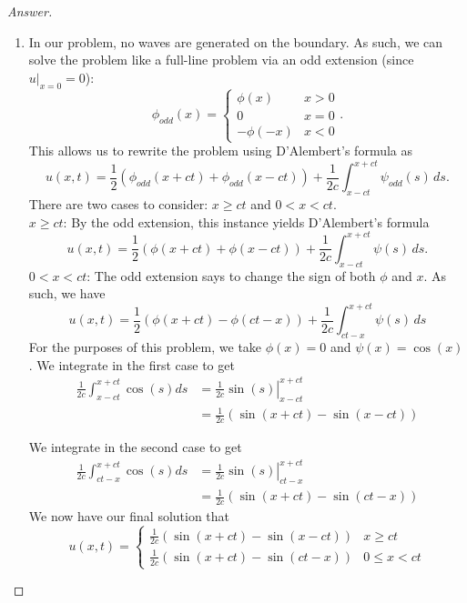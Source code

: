 \documentclass{article}
\theoremstyle{definition}
\renewcommand\qedsymbol{$\blacksquare$}
\newenvironment{ans}{\begin{proof}[Answer]\renewcommand{\qedsymbol}{}}{\end{proof}}
\begin{document}
\begin{ans}
\begin{enumerate}[(1), start=9]
    \item In our problem, no waves are generated on the boundary. As such, we can solve the problem like a full-line problem via an odd extension (since $u|_{x=0} = 0$):
    \[\phi_{odd}(x) = \begin{cases}
        \phi(x) & x > 0\\
        0 & x = 0\\
        -\phi(-x) & x < 0
    \end{cases}.\]
    This allows us to rewrite the problem using D'Alembert's formula as
    \[u(x,t) = \frac{1}{2}(\phi_{odd}(x+ct) + \phi_{odd}(x-ct)) + \frac{1}{2c}\int_{x-ct}^{x+ct}\psi_{odd}(s)\,ds.\]
    There are two cases to consider: $x \geq ct$ and $0 < x < ct$.\\
    \underline{$x \geq ct$}: By the odd extension, this instance yields D'Alembert's formula
    \[u(x,t) = \frac{1}{2}(\phi(x+ct) + \phi(x-ct)) + \frac{1}{2c}\int_{x-ct}^{x+ct}\psi(s)\,ds.\]
    \underline{$0 < x < ct$}: The odd extension says to change the sign of both $\phi$ and $x$. As such, we have
    \[u(x,t) = \frac{1}{2}(\phi(x+ct) - \phi(ct-x)) + \frac{1}{2c}\int_{ct-x}^{x+ct}\psi(s)\,ds\]
    For the purposes of this problem, we take $\phi(x) = 0$ and $\psi(x) = \cos(x)$. We integrate in the first case to get 
    \begin{align*}
        \frac{1}{2c}\int_{x-ct}^{x+ct}\cos(s)ds &= \left.\frac{1}{2c}\sin(s)\right|_{x-ct}^{x+ct}\\
        &=\frac{1}{2c}(\sin(x+ct) - \sin(x-ct))
    \end{align*}

    We integrate in the second case to get
    \begin{align*}
        \frac{1}{2c}\int_{ct-x}^{x+ct}\cos(s)ds &= \left.\frac{1}{2c}\sin(s)\right|_{ct-x}^{x+ct}\\
        &= \frac{1}{2c}(\sin(x+ct) - \sin(ct-x))
    \end{align*}
    We now have our final solution that
    \[\boxed{u(x,t) = \begin{cases}
       \frac{1}{2c}(\sin(x+ct) - \sin(x-ct)) & x \geq ct\\
        \frac{1}{2c}(\sin(x+ct) - \sin(ct-x)) & 0 \leq x < ct
    \end{cases}}\]


\end{enumerate}
\end{ans}
\end{document}
